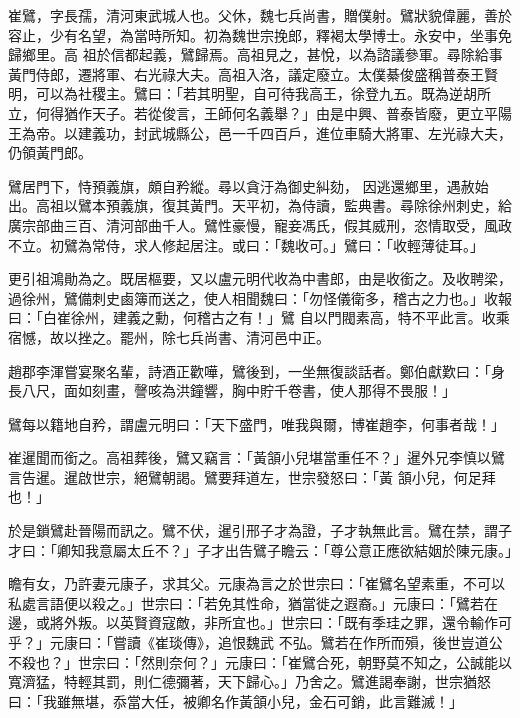 \begin{pinyinscope}
 崔鷿，字長孺，清河東武城人也。父休，魏七兵尚書，贈僕射。鷿狀貌偉麗，善於容止，少有名望，為當時所知。初為魏世宗挽郎，釋褐太學博士。永安中，坐事免歸鄉里。高
 祖於信都起義，鷿歸焉。高祖見之，甚悅，以為諮議參軍。尋除給事黃門侍郎，遷將軍、右光祿大夫。高祖入洛，議定廢立。太僕綦俊盛稱普泰王賢明，可以為社稷主。鷿曰：「若其明聖，自可待我高王，徐登九五。既為逆胡所立，何得猶作天子。若從俊言，王師何名義舉？」由是中興、普泰皆廢，更立平陽王為帝。以建義功，封武城縣公，邑一千四百戶，進位車騎大將軍、左光祿大夫，仍領黃門郎。



 鷿居門下，恃預義旗，頗自矜縱。尋以貪汙為御史糾劾，
 因逃還鄉里，遇赦始出。高祖以鷿本預義旗，復其黃門。天平初，為侍讀，監典書。尋除徐州刺史，給廣宗部曲三百、清河部曲千人。鷿性豪慢，寵妾馮氏，假其威刑，恣情取受，風政不立。初鷿為常侍，求人修起居注。或曰：「魏收可。」鷿曰：「收輕薄徒耳。」



 更引祖鴻勛為之。既居樞要，又以盧元明代收為中書郎，由是收銜之。及收聘梁，過徐州，鷿備刺史鹵簿而送之，使人相聞魏曰：「勿怪儀衛多，稽古之力也。」收報曰：「白崔徐州，建義之勳，何稽古之有！」鷿
 自以門閥素高，特不平此言。收乘宿憾，故以挫之。罷州，除七兵尚書、清河邑中正。



 趙郡李渾嘗宴聚名輩，詩酒正歡嘩，鷿後到，一坐無復談話者。鄭伯獻歎曰：「身長八尺，面如刻畫，謦咳為洪鐘響，胸中貯千卷書，使人那得不畏服！」



 鷿每以籍地自矜，謂盧元明曰：「天下盛門，唯我與爾，博崔趙李，何事者哉！」



 崔暹聞而銜之。高祖葬後，鷿又竊言：「黃頷小兒堪當重任不？」暹外兄李慎以鷿言告暹。暹啟世宗，絕鷿朝謁。鷿要拜道左，世宗發怒曰：「黃
 頷小兒，何足拜也！」



 於是鎖鷿赴晉陽而訊之。鷿不伏，暹引邢子才為證，子才執無此言。鷿在禁，謂子才曰：「卿知我意屬太丘不？」子才出告鷿子瞻云：「尊公意正應欲結姻於陳元康。」



 瞻有女，乃許妻元康子，求其父。元康為言之於世宗曰：「崔鷿名望素重，不可以私處言語便以殺之。」世宗曰：「若免其性命，猶當徙之遐裔。」元康曰：「鷿若在邊，或將外叛。以英賢資寇敵，非所宜也。」世宗曰：「既有季珪之罪，還令輸作可乎？」元康曰：「嘗讀《崔琰傳》，追恨魏武
 不弘。鷿若在作所而殞，後世豈道公不殺也？」世宗曰：「然則奈何？」元康曰：「崔鷿合死，朝野莫不知之，公誠能以寬濟猛，特輕其罰，則仁德彌著，天下歸心。」乃舍之。鷿進謁奉謝，世宗猶怒曰：「我雖無堪，忝當大任，被卿名作黃頷小兒，金石可銷，此言難滅！」




\end{pinyinscope}
